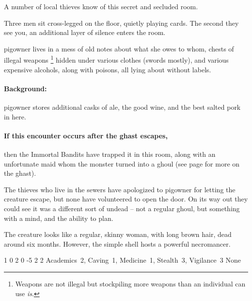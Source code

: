 \begin{multicols}{2}
A number of local thieves know of this secret and secluded room.

\begin{boxtext}
  Three men sit cross-legged on the floor, quietly playing cards.
  The second they see you, an additional layer of silence enters the room.
\end{boxtext}


\label{pigRoom}

\Gls{pigowner} lives in a mess of old notes about what she owes to whom, chests of illegal weapons%
\footnote{Weapons are not illegal but stockpiling more weapons than an individual can use \emph{is}.}
hidden under various clothes (swords mostly), and various expensive alcohols, along with poisons, all lying about without labels.


\paragraph{Background:}
\Gls{pigowner} stores additional casks of ale, the good wine, and the best salted pork in here.

\paragraph{If this encounter occurs after the ghast escapes,}
then the Immortal Bandits have trapped it in this room, along with an unfortunate maid whom the monster turned into a ghoul (see page \pageref{ghastEscape} for more on the ghast).

The thieves who live in the sewers have apologized to \gls{pigowner} for letting the creature escape, but none have volunteered to open the door.
On its way out they could see it was a different sort of undead -- not a regular ghoul, but something with a mind, and the ability to plan.

The creature looks like a regular, skinny woman, with long brown hair, dead around six months.
However, the simple shell hosts a powerful necromancer.


  {1}%
  {0}%
  {{2}%
  {0}%
  {-5}}%
  {2}%
  {2}%
  {Academics~2, Caving~1, Medicine~1, Stealth~3, Vigilance~3
  }%
  {None}%
  {}


\end{multicols}
